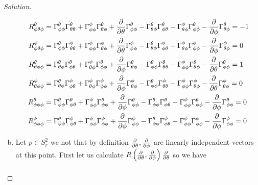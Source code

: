\documentclass[a4paper]{article}
\begin{document}
\begin{proof}[Solution]
\begin{enumerate}[(a)]
\[\begin{aligned}
      R_{\phi \theta \phi}^\theta &= \Gamma_{\phi \phi}^\theta \Gamma_{\theta \theta}^\theta + \Gamma_{\phi \phi}^\phi \Gamma_{\theta \phi}^\theta + \pdv{\theta} \Gamma_{\phi \phi}^\theta - \Gamma_{\theta \phi}^\theta \Gamma_{\phi \theta}^\theta  - \Gamma_{\theta \phi}^\phi \Gamma_{\phi \phi}^\theta - \pdv{\phi} \Gamma_{\theta \phi}^\theta =  -1 \\
      R_{\phi \theta \phi}^\phi &= \Gamma_{\phi \phi}^\theta \Gamma_{\theta \theta}^\phi + \Gamma_{\phi \phi}^\phi \Gamma_{\theta \phi}^\phi + \pdv{\theta} \Gamma_{\phi \phi}^\phi - \Gamma_{\theta \phi}^\theta \Gamma_{\phi \theta}^\phi  - \Gamma_{\theta \phi}^\phi \Gamma_{\phi \phi}^\phi - \pdv{\phi} \Gamma_{\theta \phi}^\phi =  0 \\
      R_{\theta \phi \phi}^\theta &= \Gamma_{\theta \phi}^\theta \Gamma_{\phi \theta}^\theta + \Gamma_{\theta \phi}^\phi \Gamma_{\phi \phi}^\theta + \pdv{\phi} \Gamma_{\theta \phi}^\theta - \Gamma_{\phi \phi}^\theta \Gamma_{\theta \theta}^\theta  - \Gamma_{\phi \phi}^\phi \Gamma_{\theta \phi}^\theta - \pdv{\theta} \Gamma_{\phi \phi}^\theta =  1 \\
      R_{\theta \phi \phi}^\phi &= \Gamma_{\theta \phi}^\theta \Gamma_{\phi \theta}^\phi + \Gamma_{\theta \phi}^\phi \Gamma_{\phi \phi}^\phi + \pdv{\phi} \Gamma_{\theta \phi}^\phi - \Gamma_{\phi \phi}^\theta \Gamma_{\theta \theta}^\phi  - \Gamma_{\phi \phi}^\phi \Gamma_{\theta \phi}^\phi - \pdv{\theta} \Gamma_{\theta \phi}^\phi =  0 \\
      R_{\phi \phi \phi}^\theta &= \Gamma_{\phi \phi}^\theta \Gamma_{\phi \theta}^\theta + \Gamma_{\phi \phi}^\phi \Gamma_{\phi \phi}^\theta + \pdv{\phi} \Gamma_{\phi \phi}^\theta - \Gamma_{\phi \phi}^\theta \Gamma_{\phi \theta}^\theta  - \Gamma_{\phi \phi}^\phi \Gamma_{\phi \phi}^\theta - \pdv{\phi} \Gamma_{\phi \phi}^\theta =  0 \\
      R_{\phi \phi \phi}^\phi &= \Gamma_{\phi \phi}^\theta \Gamma_{\phi \theta}^\phi + \Gamma_{\phi \phi}^\phi \Gamma_{\phi \phi}^\phi + \pdv{\phi} \Gamma_{\phi \phi}^\phi - \Gamma_{\phi \phi}^\theta \Gamma_{\phi \theta}^\phi  - \Gamma_{\phi \phi}^\phi \Gamma_{\phi \phi}^\phi - \pdv{\phi} \Gamma_{\phi \phi}^\phi =  0 \\
    \end{aligned}
  \]
\item Let $p \in S_r^2$ we not that by definition $\pdv{\theta}, \pdv{\phi}$ are linearly independent vectors at this point. First let us calculate $R \left(\pdv{\theta}, \pdv{\phi} \right)\pdv{\theta}$ so we have
  \[
    \begin{aligned}

\end{aligned}\]
\end{enumerate}
\end{proof}
\end{document}
